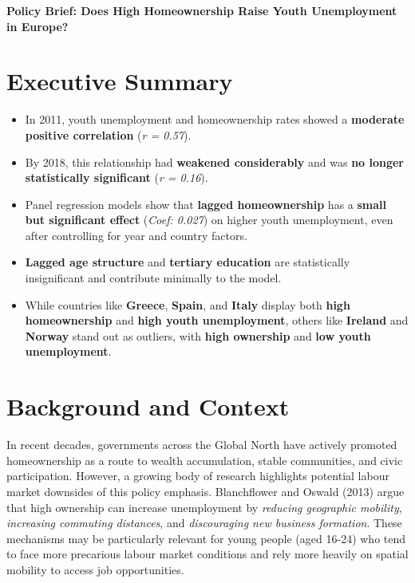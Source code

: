 \documentclass[11pt]{article}
\begin{document}
	
	\begin{center}
		\LARGE\textbf{Policy Brief: Does High Homeownership Raise Youth Unemployment in Europe?}
	\end{center}
	
	\begin{multicols}{2}
		
		\section*{Executive Summary}
		
		\vspace{-1em}
		
		\begin{tcolorbox}
			\begin{itemize}[left=0.3em, labelsep=0.5em, labelwidth=0.6em, itemsep=0pt, topsep=0pt]
				\item In 2011, youth unemployment and homeownership rates showed a \textbf{moderate positive correlation} (\textit{r = 0.57}).
				\item By 2018, this relationship had \textbf{weakened considerably} and was \textbf{no longer statistically significant} (\textit{r = 0.16}).
				\item Panel regression models show that \textbf{lagged homeownership} has a \textbf{small but significant effect} (\textit{Coef: 0.027}) on higher youth unemployment, even after controlling for year and country factors.
				\item \textbf{Lagged age structure} and \textbf{tertiary education} are statistically insignificant and contribute minimally to the model.
				\item While countries like \textbf{Greece}, \textbf{Spain}, and \textbf{Italy} display both \textbf{high homeownership} and \textbf{high youth unemployment}, others like \textbf{Ireland} and \textbf{Norway} stand out as outliers, with \textbf{high ownership} and \textbf{low youth unemployment}.
			\end{itemize}
		\end{tcolorbox}
		
		\vspace{-1em}
		
		\section*{Background and Context}
		\indent In recent decades, governments across the Global North have actively promoted homeownership as a route to wealth accumulation, stable communities, and civic participation. However, a growing body of research highlights potential labour market downsides of this policy emphasis. Blanchflower and Oswald (2013) argue that high ownership can increase unemployment by \textit{reducing geographic mobility}, \textit{increasing commuting distances}, and \textit{discouraging new business formation}. These mechanisms may be particularly relevant for young people (aged 16-24) who tend to face more precarious labour market conditions and rely more heavily on spatial mobility to access job opportunities.
				

\end{multicols}
\end{document}
